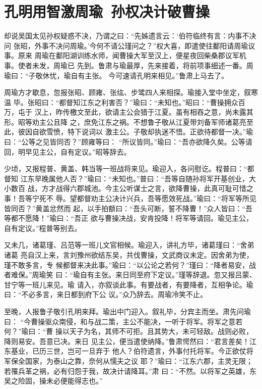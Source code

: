 \chapter{孔明用智激周瑜~孙权决计破曹操}

却说吴国太见孙权疑惑不决，乃谓之曰：“先姊遗言云：‘伯符临终有言：内事不决问
张昭，外事不决问周瑜。’今何不请公瑾问之？”权大喜，即遣使往鄱阳请周瑜议事。原来
周瑜在鄱阳湖训练水师，闻曹操大军至汉上，便星夜回柴桑郡议军机事。使者未发，周瑜已
先到。鲁肃与瑜最厚，先来接着，将前项事细述一番。周瑜曰：“子敬休忧，瑜自有主张。
今可速请孔明来相见。”鲁肃上马去了。

周瑜方才歇息，忽报张昭、顾雍、张纮、步骘四人来相探。瑜接入堂中坐定，叙寒温
毕。张昭曰：“都督知江东之利害否？”瑜曰：“未知也。”昭曰：“曹操拥众百万，屯于
汉上，昨传檄文至此，欲请主公会猎于江夏。虽有相吞之意，尚未露其形。昭等劝主公且降
之，庶免江东之祸。不想鲁子敬从江夏带刘备军师诸葛亮至此，彼因自欲雪愤，特下说词以
激主公。子敬却执迷不悟。正欲待都督一决。”瑜曰：“公等之见皆同否？”顾雍等曰：
“所议皆同。”瑜曰：“吾亦欲降久矣。公等请回，明早见主公，自有定议。”昭等辞去。

少顷，又报程普、黄盖、韩当等一班战将来见。瑜迎入，各问慰讫。程普曰：“都督知
江东早晚属他人否？”瑜曰：“未知也。”普曰：“吾等自随孙将军开基创业，大小数百
战，方才战得六郡城池。今主公听谋士之言，欲降曹操，此真可耻可惜之事！吾等宁死不
辱。望都督劝主公决计兴兵，吾等愿效死战。”瑜曰：“将军等所见皆同否？”黄盖忿然而
起，以手拍额曰：“吾头可断，誓不降曹！”众人皆曰：“吾等都不愿降！”瑜曰：“吾正
欲与曹操决战，安肯投降！将军等请回。瑜见主公，自有定议。”程普等别去。

又未几，诸葛瑾、吕范等一班儿文官相候。瑜迎入，讲礼方毕，诸葛瑾曰：“舍弟诸葛
亮自汉上来，言刘豫州欲结东吴，共伐曹操，文武商议未定。因舍弟为使，瑾不敢多言，专
候都督来决此事。”瑜曰：“以公论之若何？”瑾曰：“降者易安，战者难保。”周瑜笑
曰：“瑜自有主张。来日同至府下定议。”瑾等辞退。忽又报吕蒙、甘宁等一班儿来见。瑜
请入，亦叙谈此事。有要战者，有要降者，互相争论。瑜曰：“不必多言，来日都到府下公
议。”众乃辞去。周瑜冷笑不止。

至晚，人报鲁子敬引孔明来拜。瑜出中门迎入。叙礼毕，分宾主而坐。肃先问瑜曰：
“今曹操驱众南侵，和与战二策，主公不能决，一听于将军。将军之意若何？”瑜曰：“曹
操以天子为名，其师不可拒。且其势大，未可轻敌。战则必败，降则易安。吾意已决。来日
见主公，便当遣使纳降。”鲁肃愕然曰：“君言差矣！江东基业，已历三世，岂可一旦弃于
他人？伯符遗言，外事付托将军。今正欲仗将军保全国家，为泰山之靠，奈何从懦夫之议
耶？”瑜曰：“江东六郡，主灵无限；若罹兵革之祸，必有归怨于我，故决计请降耳。”肃
曰：“不然。以将军之英雄，东吴之险固，操未必便能得志也。”

